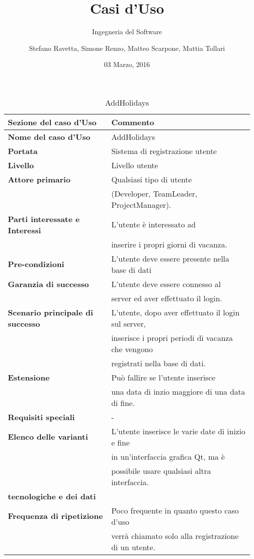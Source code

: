 \documentclass[12pt]{scrartcl}
\title{Casi d'Uso}
\subtitle{Ingegneria del Software}
\author{Stefano Ravetta, Simone Renzo, Matteo Scarpone, Mattia Tollari}
\date{03 Marzo, 2016}
\begin{document}
\maketitle

\begin{table}[h!]
  
  \caption{AddHolidays}
  \label{tab:table1}
  \begin{tabular}{|l|l|}
    \toprule
    \textbf{Sezione del caso d'Uso} & \textbf{Commento}\\
    \midrule
    \textbf{Nome del caso d'Uso} & AddHolidays\\
    \midrule
    \textbf{Portata} & Sistema di registrazione utente\\
    \midrule
    \textbf{Livello} & Livello utente\\
    \midrule
    \textbf{Attore primario} & Qualsiasi tipo di utente \\& (Developer, TeamLeader, ProjectManager).\\
    \midrule
    \textbf{Parti interessate e Interessi} & L'utente \`e interessato ad 
    \\ & inserire i propri giorni di vacanza.\\
    \midrule
    \textbf{Pre-condizioni} & L'utente deve essere presente nella base di dati \\
    \midrule
    \textbf{Garanzia di successo} & L'utente deve essere connesso al \\ & server ed aver effettuato il login. \\
    \midrule
    \textbf{Scenario principale di successo} & L'utente, dopo aver effettuato il login sul server,
    \\& inserisce i propri periodi di  vacanza che vengono \\& registrati nella base di dati. \\
    \midrule
    \textbf{Estensione} & Pu\`o fallire se l'utente inserisce \\& una data di inzio maggiore di una data di fine.\\
    \midrule
    \textbf{Requisiti speciali} & - \\
    \midrule
    \textbf{Elenco delle varianti} & L'utente inserisce le varie date di inizio e fine 
    \\& in un'interfaccia grafica Qt, ma \`e \\& possibile usare qualsiasi altra interfaccia.\\ 
    \textbf{tecnologiche e dei dati} & \\
    \midrule
    \textbf{Frequenza di ripetizione} & Poco frequente in quanto questo caso d'uso \\& verr\`a chiamato solo alla registrazione di un utente.\\
    \bottomrule
  \end{tabular}
\end{table}
\end{document}
